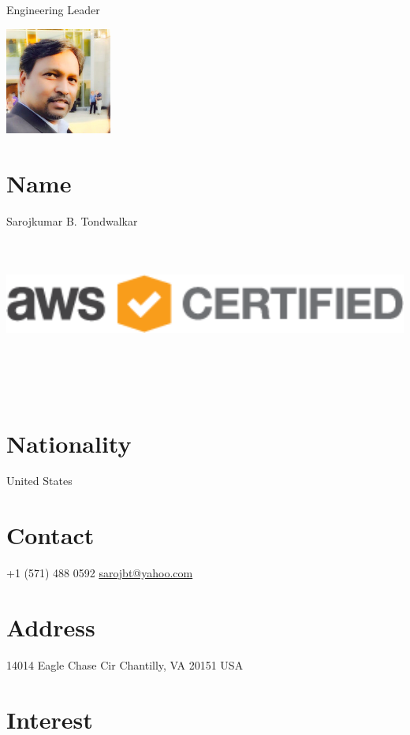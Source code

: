 \documentclass[]{friggeri-cv}
\begin{document}
      {Engineering Leader}
      



\begin{aside}
\includegraphics[height=3.5cm]{img/0.jpg}
~
    ~      
  \section{Name}
     Sarojkumar B. Tondwalkar
    ~    
~
\includegraphics[angle=90,height=5cm]{img/AWS_Certified_Logo_SAA_294x230_Color.png}
~
    ~      
  \section{Nationality}
     United States
    ~    
~
~
  \section{Contact}
    +1 (571) 488 0592
    \href{mailto:sarojbt@yahoo.com}{sarojbt@yahoo.com}
   ~
~
~
\section{Address}
    14014 Eagle Chase Cir
    Chantilly, VA 20151
    USA
\end{aside}

\section{Interest}
\end{document}
